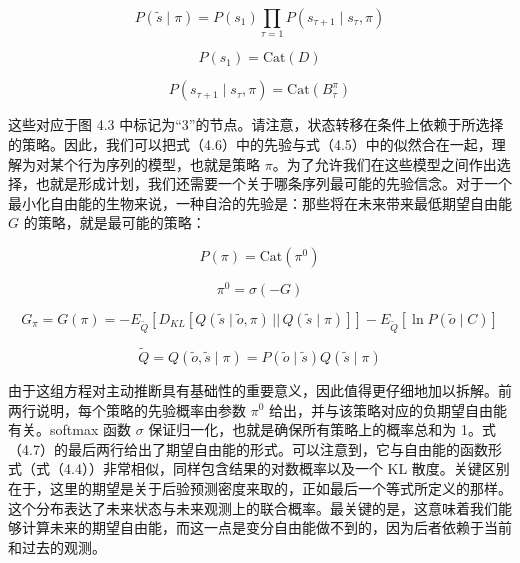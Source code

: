 \begin{equation}
P(\tilde{s} \mid \pi) = P(s_1)\prod_{\tau=1} P(s_{\tau+1} \mid s_\tau, \pi)
\tag{4.6}
\end{equation}

\begin{equation}
P(s_1) = \mathrm{Cat}(D)
\tag{4.6}
\end{equation}

\begin{equation}
P(s_{\tau+1} \mid s_\tau, \pi) = \mathrm{Cat}(B^\pi_\tau)
\tag{4.6}
\end{equation}

这些对应于图 4.3 中标记为“3”的节点。请注意，状态转移在条件上依赖于所选择的策略。因此，我们可以把式（4.6）中的先验与式（4.5）中的似然合在一起，理解为对某个行为序列的模型，也就是策略 $\pi$。为了允许我们在这些模型之间作出选择，也就是形成计划，我们还需要一个关于哪条序列最可能的先验信念。对于一个最小化自由能的生物来说，一种自洽的先验是：那些将在未来带来最低期望自由能 $G$ 的策略，就是最可能的策略：

\begin{equation}
P(\pi) = \mathrm{Cat}(\pi^0)
\tag{4.7}
\end{equation}

\begin{equation}
\pi^0 = \sigma(-G)
\tag{4.7}
\end{equation}

\begin{equation}
G_\pi = G(\pi)
= -E_{\tilde{Q}}\!\left[D_{KL}\!\left[Q(\tilde{s} \mid \tilde{o}, \pi)\,||\,Q(\tilde{s} \mid \pi)\right]\right]
- E_{\tilde{Q}}[\ln P(\tilde{o} \mid C)]
\tag{4.7}
\end{equation}

\begin{equation}
\tilde{Q} = Q(\tilde{o}, \tilde{s} \mid \pi) = P(\tilde{o} \mid \tilde{s})Q(\tilde{s} \mid \pi)
\tag{4.7}
\end{equation}

由于这组方程对主动推断具有基础性的重要意义，因此值得更仔细地加以拆解。前两行说明，每个策略的先验概率由参数 $\pi^0$ 给出，并与该策略对应的负期望自由能有关。softmax 函数 $\sigma$ 保证归一化，也就是确保所有策略上的概率总和为 1。式（4.7）的最后两行给出了期望自由能的形式。可以注意到，它与自由能的函数形式（式（4.4））非常相似，同样包含结果的对数概率以及一个 KL 散度。关键区别在于，这里的期望是关于后验预测密度来取的，正如最后一个等式所定义的那样。这个分布表达了未来状态与未来观测上的联合概率。最关键的是，这意味着我们能够计算未来的期望自由能，而这一点是变分自由能做不到的，因为后者依赖于当前和过去的观测。

